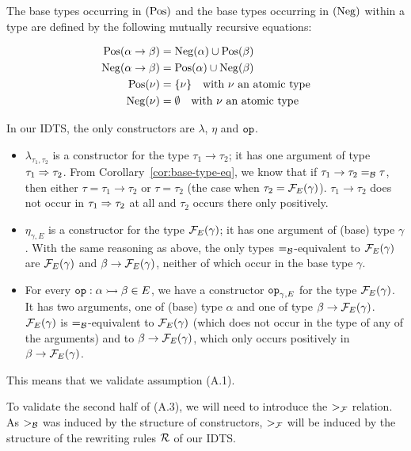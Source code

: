 \begin{definition}
  The base types occurring in  $(\operatorname{Pos})$ and the
  base types occurring in  $(\operatorname{Neg})$ within a type
  are defined by the following mutually recursive equations:

  \begin{align*}
    \operatorname{Pos}(\alpha \to \beta) &= \operatorname{Neg}(\alpha) \cup \operatorname{Pos}(\beta) \\
    \operatorname{Neg}(\alpha \to \beta) &= \operatorname{Pos}(\alpha) \cup \operatorname{Neg}(\beta) \\
    \operatorname{Pos}(\nu) &= \{ \nu \} \text{\quad with $\nu$ an atomic type} \\
    \operatorname{Neg}(\nu) &= \emptyset \text{\quad with $\nu$ an atomic type}
  \end{align*}
\end{definition}

In our IDTS, the only constructors are $\lambda$, $\eta$ and
$\mathtt{op}$.
\begin{itemize}
\item $\lambda_{\tau_1, \tau_2}$ is a constructor for the type
  $\tau_1 \to \tau_2$; it has one argument of type $\tau_1 \Rightarrow
  \tau_2$. From Corollary~\ref{cor:base-type-eq}, we know that if
  $\tau_1 \to \tau_2 =_{\mathcal{B}} \tau$, then either $\tau = \tau_1 \to \tau_2$ or
  $\tau = \tau_2$ (the case when $\tau_2 = \mathcal{F}_E(\gamma)$).
  $\tau_1 \to \tau_2$ does not occur in $\tau_1 \Rightarrow \tau_2$ at all and
  $\tau_2$ occurs there only positively.
\item $\eta_{\gamma, E}$ is a constructor for the type $\mathcal{F}_E(\gamma)$; it
  has one argument of (base) type $\gamma$. With the same reasoning as
  above, the only types $=_{\mathcal{B}}$-equivalent to $\mathcal{F}_E(\gamma)$ are
  $\mathcal{F}_E(\gamma)$ and $\beta \to \mathcal{F}_E(\gamma)$, neither of which occur in
  the base type $\gamma$.
\item For every $\mathtt{op} : \alpha \rightarrowtail \beta \in E$, we have a constructor
  $\mathtt{op}_{\gamma, E}$ for the type $\mathcal{F}_E(\gamma)$. It has two arguments,
  one of (base) type $\alpha$ and one of type $\beta \to
  \mathcal{F}_E(\gamma)$. $\mathcal{F}_E(\gamma)$ is $=_{\mathcal{B}}$-equivalent to $\mathcal{F}_E(\gamma)$
  (which does not occur in the type of any of the arguments) and to
  $\beta \to \mathcal{F}_E(\gamma)$, which only occurs positively in
  $\beta \to \mathcal{F}_E(\gamma)$.
\end{itemize}

This means that we validate assumption (A.1).

To validate the second half of (A.3), we will need to introduce the $>_{\mathcal{F}}$
relation. As $>_{\mathcal{B}}$ was induced by the structure of constructors, $>_{\mathcal{F}}$
will be induced by the structure of the rewriting rules $\mathcal{R}$ of our IDTS.

